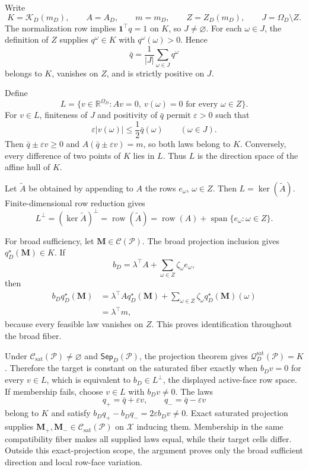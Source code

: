Write
\[
K=\mathcal K_D(m_D),\qquad A=A_D,\qquad m=m_D,
\qquad Z=Z_D(m_D),\qquad J=\Omega_D\setminus Z.
\]
The normalization row implies \(\mathbf 1^\top q=1\) on \(K\), so \(J\ne\varnothing\). For each \(\omega\in J\), the definition of \(Z\) supplies \(q^\omega\in K\) with \(q^\omega(\omega)>0\). Hence
\[
\bar q=\frac1{|J|}\sum_{\omega\in J}q^\omega
\]
belongs to \(K\), vanishes on \(Z\), and is strictly positive on \(J\).

Define
\[
L=\{v\in\mathbb R^{\Omega_D}:Av=0,
\ v(\omega)=0\text{ for every }\omega\in Z\}.
\]
For \(v\in L\), finiteness of \(J\) and positivity of \(\bar q\) permit \(\varepsilon>0\) such that
\[
\varepsilon|v(\omega)|\leq\frac12\bar q(\omega)
\qquad(\omega\in J).
\]
Then \(\bar q\pm\varepsilon v\geq0\) and \(A(\bar q\pm\varepsilon v)=m\), so both laws belong to \(K\). Conversely, every difference of two points of \(K\) lies in \(L\). Thus \(L\) is the direction space of the affine hull of \(K\).

Let \(\widetilde A\) be obtained by appending to \(A\) the rows \(e_\omega\), \(\omega\in Z\). Then \(L=\ker(\widetilde A)\). Finite-dimensional row reduction gives
\[
L^\perp=(\ker\widetilde A)^\perp
=\operatorname{row}(\widetilde A)
=\operatorname{row}(A)+\operatorname{span}\{e_\omega:\omega\in Z\}.
\]

For broad sufficiency, let \(\mathbf M\in\mathcal C(\mathcal P)\). The broad projection inclusion gives \(q_D^\star(\mathbf M)\in K\). If
\[
b_D=\lambda^\top A+
\sum_{\omega\in Z}\zeta_\omega e_\omega,
\]
then
\[
\begin{aligned}
b_Dq_D^\star(\mathbf M)
&=\lambda^\top A q_D^\star(\mathbf M)
+\sum_{\omega\in Z}\zeta_\omega q_D^\star(\mathbf M)(\omega)\\
&=\lambda^\top m,
\end{aligned}
\]
because every feasible law vanishes on \(Z\). This proves identification throughout the broad fiber.

Under \(\mathcal C_{\mathrm{sat}}(\mathcal P)\ne\varnothing\) and \(\mathsf{Sep}_D(\mathcal P)\), the projection theorem gives \(\mathcal Q_D^{\mathrm{sat}}(\mathcal P)=K\). Therefore the target is constant on the saturated fiber exactly when \(b_Dv=0\) for every \(v\in L\), which is equivalent to \(b_D\in L^\perp\), the displayed active-face row space. If membership fails, choose \(v\in L\) with \(b_Dv\ne0\). The laws
\[
q_+=\bar q+\varepsilon v,
\qquad
q_-=\bar q-\varepsilon v
\]
belong to \(K\) and satisfy \(b_Dq_+-b_Dq_-=2\varepsilon b_Dv\ne0\). Exact saturated projection supplies \(\mathbf M_+,\mathbf M_-\in\mathcal C_{\mathrm{sat}}(\mathcal P)\) on \(\mathcal X\) inducing them. Membership in the same compatibility fiber makes all supplied laws equal, while their target cells differ. Outside this exact-projection scope, the argument proves only the broad sufficient direction and local row-face variation.